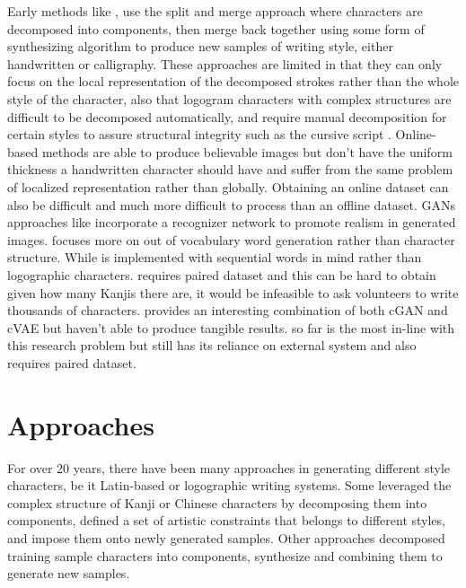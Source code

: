 \documentclass[12pt]{report}
\begin{document}
Early methods like \cite{automatic-calligraphy}, \cite{automatic-handwritten} use the split and merge approach where characters are decomposed into components, then merge back together using some form of synthesizing algorithm to produce new samples of writing style, either handwritten or calligraphy. These approaches are limited in that they can only focus on the local representation of the decomposed strokes rather than the whole style of the character, also that logogram characters with complex structures are difficult to be decomposed automatically, and require manual decomposition for certain styles to assure structural integrity such as the cursive script \cite{intel-system}.
Online-based methods \cite{online-kanji} \cite{online-kanji-2} are able to produce believable images but don’t have the uniform thickness a handwritten character should have and suffer from the same problem of localized representation rather than globally. Obtaining an online dataset can also be difficult and much more difficult to process than an offline dataset.
GANs approaches like \cite{zi2zi}\cite{handwritten-cgan}\cite{calligan}\cite{scrabble-gan}\cite{gan-writting} incorporate a recognizer network to promote realism in generated images. \cite{gan-writting} focuses more on out of vocabulary word generation rather than character structure. While \cite{scrabble-gan} is implemented with sequential words in mind rather than logographic characters. \cite{zi2zi} requires paired dataset and this can be hard to obtain given how many Kanjis there are, it would be infeasible to ask volunteers to write thousands of characters. \cite{handwritten-cgan} provides an interesting combination of both cGAN \cite{cgan} and cVAE \cite{cvae} but haven’t able to produce tangible results. \cite{calligan} so far is the most in-line with this research problem but still has its reliance on external system \cite{casia} and also requires paired dataset.

\section{Approaches}
For over 20 years, there have been many approaches in generating different style characters, be it Latin-based or logographic writing systems.
Some leveraged the complex structure of Kanji or Chinese characters by decomposing them into components, defined a set of artistic constraints that belongs to different styles, and impose them onto newly generated samples. Other approaches decomposed training sample characters into components, synthesize and combining them to generate new samples.
\end{document}

